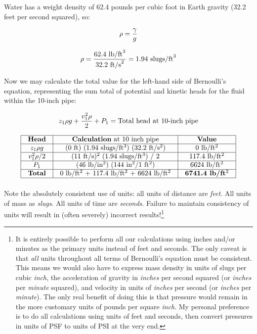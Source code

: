 Water has a weight density of 62.4 pounds per cubic foot in Earth gravity (32.2 feet per second squared), so:

$$\rho = {\gamma \over g}$$

$$\rho = {62.4 \hbox{ lb/ft}^3 \over 32.2 \hbox{ ft/s}^2} = 1.94 \hbox{ slugs/ft}^3$$

Now we may calculate the total value for the left-hand side of Bernoulli's equation, representing the sum total of potential and kinetic heads for the fluid within the 10-inch pipe:

$$z_1 \rho g + {v_1^2 \rho \over 2} + P_1 = \hbox{Total head at 10-inch pipe}$$


$$\vbox{\offinterlineskip
\halign{\strut
\vrule \quad\hfil # \ \hfil & 
\vrule \quad\hfil # \ \hfil & 
\vrule \quad\hfil # \ \hfil \vrule \cr
\noalign{\hrule}
%
\textbf{Head} & \textbf{Calculation} at 10 inch pipe & \textbf{Value} \cr
%
\noalign{\hrule}
%
$z_1 \rho g$ & (0 ft) (1.94 slugs/ft$^{3}$) (32.2 ft/s$^{2}$) & 0 lb/ft$^{2}$ \cr
%
\noalign{\hrule}
%
$v_1^2 \rho / 2$ & (11 ft/s)$^{2}$ (1.94 slugs/ft$^{3}$) / 2 & 117.4 lb/ft$^{2}$ \cr
%
\noalign{\hrule}
%
$P_1$ & (46 lb/in$^{2}$) (144 in$^{2}$/1 ft$^{2}$) & 6624 lb/ft$^{2}$ \cr
%
\noalign{\hrule}
%
\textbf{Total} &  0 lb/ft$^{2}$ + 117.4 lb/ft$^{2}$ + 6624 lb/ft$^{2}$ & \textbf{6741.4 lb/ft$^{2}$} \cr
%
\noalign{\hrule}
} %
}$$ %

Note the absolutely consistent use of units: all units of distance are \textit{feet}.  All units of mass as \textit{slugs}.  All units of time are \textit{seconds}.  Failure to maintain consistency of units will result in (often severely) incorrect results!\footnote{It is entirely possible to perform all our calculations using inches and/or minutes as the primary units instead of feet and seconds.  The only caveat is that \textit{all} units throughout all terms of Bernoulli's equation must be consistent.  This means we would also have to express mass density in units of slugs per cubic \textit{inch}, the acceleration of gravity in \textit{inches} per second squared (or \textit{inches} per \textit{minute} squared), and velocity in units of \textit{inches} per second (or \textit{inches} per \textit{minute}).  The only real benefit of doing this is that pressure would remain in the more customary units of pounds per square \textit{inch}.  My personal preference is to do all calculations using units of feet and seconds, then convert pressures in units of PSF to units of PSI at the very end.}

